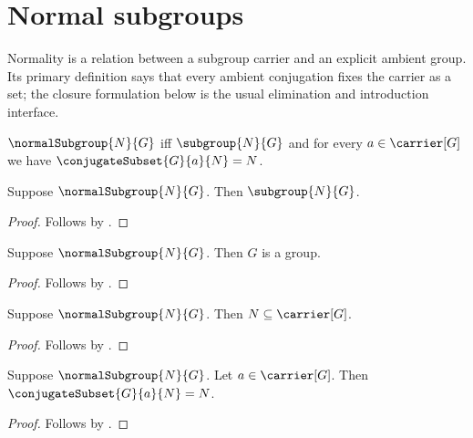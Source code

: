 

\section{Normal subgroups}

Normality is a relation between a subgroup carrier and an explicit ambient
group.  Its primary definition says that every ambient conjugation fixes the
carrier as a set; the closure formulation below is the usual elimination and
introduction interface.

\begin{definition}\label{normal_subgroup}
    $\normalSubgroup{N}{G}$ iff
        $\subgroup{N}{G}$ and
        for every $a\in\carrier[G]$ we have
            $\conjugateSubset{G}{a}{N}=N$.
\end{definition}

\begin{proposition}\label{normal_subgroup_is_subgroup}
    Suppose $\normalSubgroup{N}{G}$.
    Then $\subgroup{N}{G}$.
\end{proposition}
\begin{proof}
    Follows by .
\end{proof}

\begin{corollary}\label{normal_subgroup_ambient_group}
    Suppose $\normalSubgroup{N}{G}$.
    Then $G$ is a group.
\end{corollary}
\begin{proof}
    Follows by
        .
\end{proof}

\begin{corollary}\label{normal_subgroup_subseteq}
    Suppose $\normalSubgroup{N}{G}$.
    Then $N\subseteq\carrier[G]$.
\end{corollary}
\begin{proof}
    Follows by
        .
\end{proof}

\begin{proposition}\label{normal_subgroup_fixed_conjugate}
    Suppose $\normalSubgroup{N}{G}$.
    Let $a\in\carrier[G]$.
    Then $\conjugateSubset{G}{a}{N}=N$.
\end{proposition}
\begin{proof}
    Follows by .
\end{proof}

